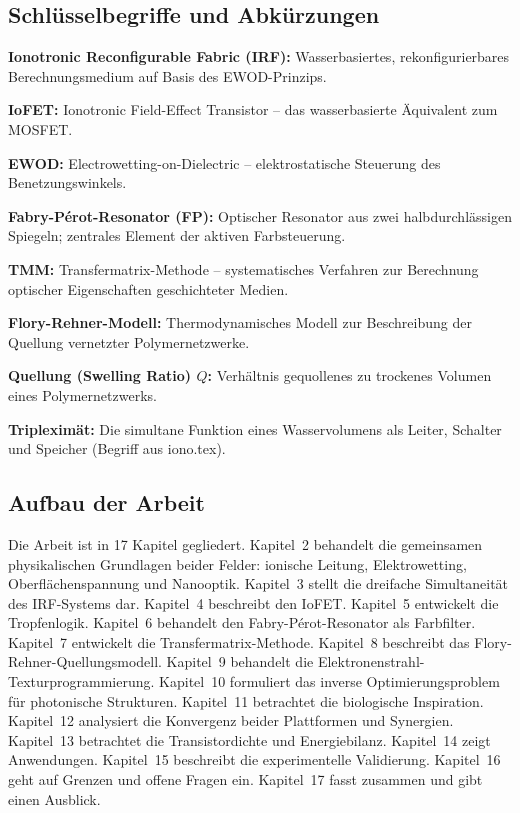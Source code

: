 ﻿\documentclass[a4paper,12pt]{scrreprt}
\theoremstyle{definition}
\begin{document}
\subsection{Schlüsselbegriffe und Abkürzungen}

\textbf{Ionotronic Reconfigurable Fabric (IRF):} Wasserbasiertes,
rekonfigurierbares Berechnungsmedium auf Basis des EWOD-Prinzips.

\textbf{IoFET:} Ionotronic Field-Effect Transistor -- das wasserbasierte
Äquivalent zum MOSFET.

\textbf{EWOD:} Electrowetting-on-Dielectric -- elektrostatische Steuerung
des Benetzungswinkels.

\textbf{Fabry-P{\'e}rot-Resonator (FP):} Optischer Resonator aus zwei
halbdurchlässigen Spiegeln; zentrales Element der aktiven Farbsteuerung.

\textbf{TMM:} Transfermatrix-Methode -- systematisches Verfahren zur
Berechnung optischer Eigenschaften geschichteter Medien.

\textbf{Flory-Rehner-Modell:} Thermodynamisches Modell zur Beschreibung
der Quellung vernetzter Polymernetzwerke.

\textbf{Quellung (Swelling Ratio) $Q$:} Verhältnis gequollenes zu
trockenes Volumen eines Polymernetzwerks.

\textbf{Tripleximät:} Die simultane Funktion eines Wasservolumens als
Leiter, Schalter und Speicher (Begriff aus iono.tex).

\subsection{Aufbau der Arbeit}

Die Arbeit ist in 17 Kapitel gegliedert. Kapitel~2 behandelt
die gemeinsamen physikalischen Grundlagen beider Felder: ionische Leitung,
Elektrowetting, Oberflächenspannung und Nanooptik. Kapitel~3 stellt die
dreifache Simultaneität des IRF-Systems dar. Kapitel~4 beschreibt den IoFET.
Kapitel~5 entwickelt die Tropfenlogik. Kapitel~6 behandelt den
Fabry-P{\'e}rot-Resonator als Farbfilter. Kapitel~7 entwickelt die
Transfermatrix-Methode. Kapitel~8 beschreibt das Flory-Rehner-Quellungsmodell.
Kapitel~9 behandelt die Elektronenstrahl-Texturprogrammierung. Kapitel~10
formuliert das inverse Optimierungsproblem für photonische Strukturen. Kapitel~11 betrachtet die biologische Inspiration. Kapitel~12 analysiert die Konvergenz beider Plattformen und Synergien.
Kapitel~13 betrachtet die Transistordichte und Energiebilanz. Kapitel~14 zeigt Anwendungen. Kapitel~15 beschreibt die experimentelle Validierung. Kapitel~16 geht auf Grenzen und offene Fragen ein. Kapitel~17 fasst zusammen und gibt einen Ausblick.
\end{document}
